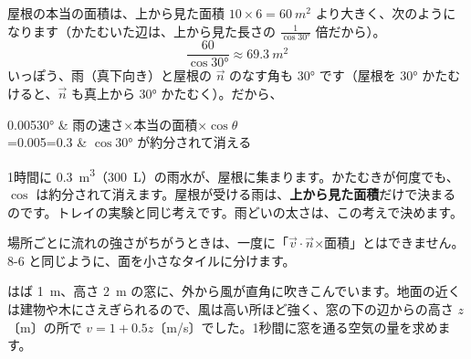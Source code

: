屋根の本当の面積は、上から見た面積 $10\times6=\qty{60}{m^2}$ より大きく、次のようになります（かたむいた辺は、上から見た長さの $\tfrac{1}{\cos\ang{30}}$ 倍だから）。
\[ \frac{60}{\cos\ang{30}}\approx\qty{69.3}{m^2} \]
いっぽう、雨（真下向き）と屋根の $\vec n$ のなす角も \ang{30} です（屋根を \ang{30} かたむけると、$\vec n$ も真上から \ang{30} かたむく）。だから、
\begin{bkhenkei}[0.5]
0.005\times{}\times\cos\ang{30} & 雨の速さ×本当の面積×$\cos\theta$ \\
=0.005=0.3 & $\cos\ang{30}$ が約分されて消える \\
\end{bkhenkei}
1時間に \qty{0.3}{m^3}（\qty{300}{L}）の雨水が、屋根に集まります。かたむきが何度でも、$\cos$ は約分されて消えます。屋根が受ける雨は、\textbf{上から見た面積}だけで決まるのです。トレイの実験と同じ考えです。雨どいの太さは、この考えで決めます。


\label{bk:8-8:mado}場所ごとに流れの強さがちがうときは、一度に「$\vec v\cdot\vec n$×面積」とはできません。8-6 と同じように、面を小さなタイルに分けます。

はば \qty{1}{m}、高さ \qty{2}{m} の窓に、外から風が直角に吹きこんでいます。地面の近くは建物や木にさえぎられるので、風は高い所ほど強く、窓の下の辺からの高さ $z$〔m〕の所で $v=1+0.5z$〔m/s〕でした。1秒間に窓を通る空気の量を求めます。

